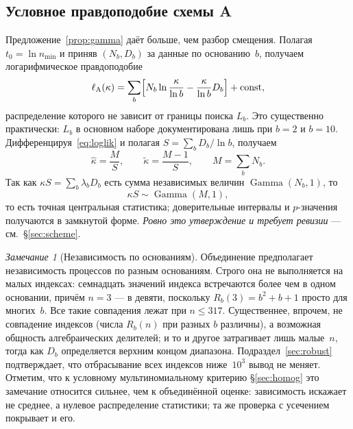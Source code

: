 \documentclass[11pt,a4paper]{article}
\theoremstyle{plain}
\theoremstyle{remark}
\newtheorem{remark}{Замечание}
\newcommand{\Rb}{R_b}
\DeclareMathOperator{\Gam}{Gamma}
\begin{document}
\subsection{Условное правдоподобие схемы A}\label{sec:condlik}

Предложение~\ref{prop:gamma} даёт больше, чем разбор смещения. Полагая $t_0=\ln n_{\min}$
и приняв $(N_b,D_b)$ за данные по основанию~$b$, получаем логарифмическое правдоподобие
\begin{equation}\label{eq:loglik}
\ell_{\mathrm A}(\kappa)=\sum_b\Bigl[N_b\ln\frac{\kappa}{\ln b}-\frac{\kappa}{\ln b}D_b\Bigr]+\mathrm{const},
\end{equation}
распределение которого не зависит от границы поиска $L_b$. Это существенно практически:
$L_b$ в основном наборе документирована лишь при $b=2$ и $b=10$. Дифференцируя~\eqref{eq:loglik} и полагая
$S=\sum_b D_b/\ln b$, получаем
\begin{equation}\label{eq:mle}
\hat\kappa=\frac{M}{S},\qquad \tilde\kappa=\frac{M-1}{S},\qquad M=\sum_b N_b .
\end{equation}
Так как $\kappa S=\sum_b\lambda_bD_b$ есть сумма независимых величин $\Gam(N_b,1)$, то
\begin{equation}\label{eq:pivot}
\kappa S\sim\Gam(M,1),
\end{equation}
то есть точная центральная статистика; доверительные интервалы и $p$-значения получаются
в замкнутой форме. \emph{Ровно это утверждение и требует ревизии} --- см.~\S\ref{sec:scheme}.

\begin{remark}[Независимость по основаниям]\label{rem:indep}
Объединение предполагает независимость процессов по разным основаниям. Строго она не
выполняется на малых индексах: семнадцать значений индекса встречаются более чем в одном
основании, причём $n=3$ --- в девяти, поскольку $\Rb(3)=b^2+b+1$ просто для многих~$b$.
Все такие совпадения лежат при $n\le317$. Существеннее, впрочем, не совпадение индексов
(числа $\Rb(n)$ при разных $b$ различны), а возможная общность алгебраических делителей;
и то и другое затрагивает лишь малые~$n$, тогда как $D_b$ определяется верхним концом
диапазона. Подраздел~\ref{sec:robust} подтверждает, что отбрасывание всех индексов ниже~$10^3$
вывод не меняет. Отметим, что к условному мультиномиальному критерию
\S\ref{sec:homog} это замечание относится сильнее, чем к объединённой оценке:
зависимость искажает не среднее, а нулевое распределение статистики; та же
проверка с усечением покрывает и его.
\end{remark}
\end{document}

